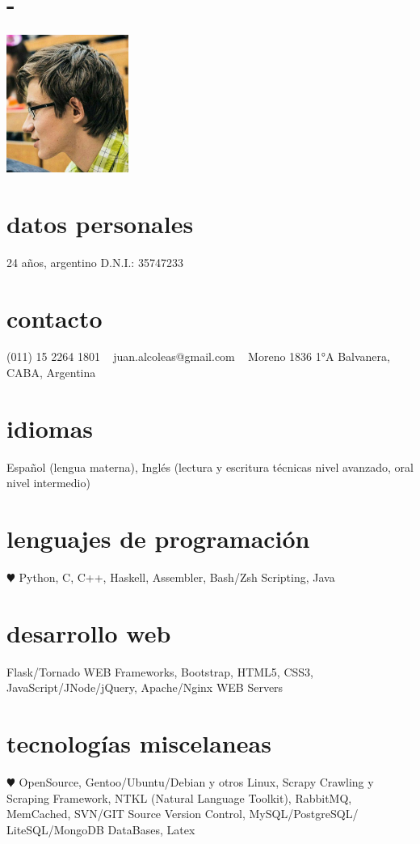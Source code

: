 \documentclass[espanol]{cv-style}     %
\begin{document}
\lastupdated

\begin{aside}
\section{-}
\includegraphics[width=4cm]{ava}
%
\section{datos personales}
24 años, argentino
D.N.I.: 35747233
%
\section{contacto}
(011) 15 2264 1801
~
juan.alcoleas@gmail.com
~
Moreno 1836 1°A
Balvanera, CABA, Argentina
%
\section{idiomas}
Español (lengua materna),
Inglés (lectura y escritura técnicas nivel avanzado, oral nivel intermedio)
%
\section{lenguajes de programación}
{\color{red} $\varheartsuit$} Python, C, C++, Haskell, Assembler, Bash/Zsh Scripting, Java
%
\section{desarrollo web}
Flask/Tornado WEB Frameworks, Bootstrap, HTML5, CSS3, JavaScript/JNode/jQuery, Apache/Nginx WEB Servers
%
\section{tecnologías miscelaneas}
{\color{red} $\varheartsuit$} OpenSource, Gentoo/Ubuntu/Debian y otros Linux, Scrapy Crawling y Scraping Framework, NTKL (Natural Language Toolkit), RabbitMQ, MemCached, SVN/GIT Source Version Control, MySQL/PostgreSQL/ LiteSQL/MongoDB DataBases, Latex
%
\end{aside}
\vspace{0.2cm}
\end{document}
